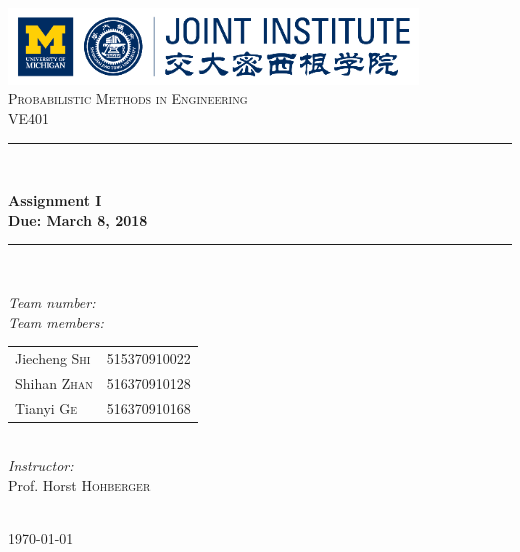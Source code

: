 \begin{titlepage}

\newcommand{\HRule}{\rule{\linewidth}{0.5mm}}

\center

\includegraphics[height=0.8in]{images/logo.png}\\[1cm]

\textsc{\Large Probabilistic Methods in Engineering}\\[0.4cm]
\textsc{\large VE401}\\[0.4cm]

\HRule \\[0.4cm]
{
    \bfseries
    {\huge Assignment I}\\[0.3cm]
    {\large Due: March 8, 2018}\\[0.2cm]
    \HRule \\[1.5cm]
}

\begin{minipage}{0.4\textwidth}

\large
\emph{Team number:} \quad{}\\

\emph{Team members:}\\

\begin{tabular}{ll}
    Jiecheng  \textsc{Shi} & 515370910022\\
    Shihan  \textsc{Zhan} & 516370910128\\
    Tianyi  \textsc{Ge} & 516370910168\\
\end{tabular}\\[1cm]


\emph{Instructor:}\\[0.1cm]
Prof. Horst \textsc{Hohberger}

\end{minipage}\\[2cm]

{\large \today}\\[2cm]

\vfill

\end{titlepage}

\clearpage
